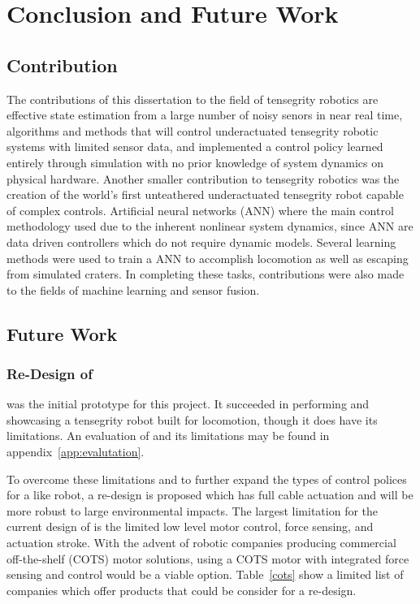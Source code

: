 \chapter{Conclusion and Future Work}
\label{conclusion}

\section{Contribution}
The contributions of this dissertation to the field of tensegrity robotics are effective state estimation from a large number of noisy senors in near real time, algorithms and methods that will control underactuated tensegrity robotic systems with limited sensor data, and implemented a control policy learned entirely through simulation with no prior knowledge of system dynamics on physical hardware.
Another smaller contribution to tensegrity robotics was the creation of the world's first unteathered underactuated tensegrity robot capable of complex controls.
Artificial neural networks (ANN) where the main control methodology used due to the inherent nonlinear system dynamics, since ANN are data driven controllers which do not require dynamic models.
Several learning methods were used to train a ANN to accomplish locomotion as well as escaping from simulated craters.
In completing these tasks, contributions were also made to the fields of machine learning and sensor fusion.

\section{Future Work}

\subsection{Re-Design of \SB{}}
\label{sec:sbv2}
\SB{} was the initial prototype for this project.
It succeeded in performing and showcasing a tensegrity robot built for locomotion, though it does have its limitations.
An evaluation of \SB{} and its limitations may be found in appendix~\ref{app:evalutation}. 

To overcome these limitations and to further expand the types of control polices for a \SB{} like robot, a re-design is proposed which has full cable actuation and will be more robust to large environmental impacts.
The largest limitation for the current design of \SB{} is the limited low level motor control, force sensing, and actuation stroke.
With the advent of robotic companies producing commercial off-the-shelf (COTS) motor solutions, using a COTS motor with integrated force sensing and control would be a viable option.
Table~\ref{cots} show a limited list of companies which offer products that could be consider for a \SB{} re-design.

